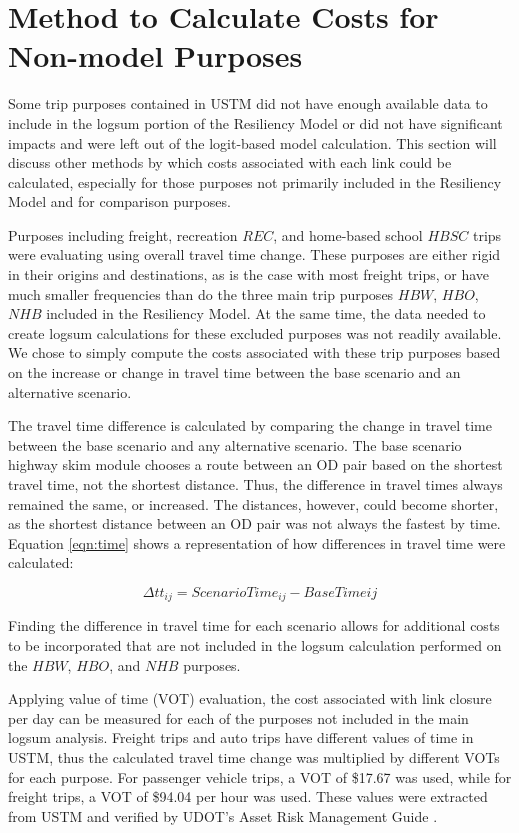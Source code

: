 \section{Method to Calculate Costs for Non-model Purposes}

Some trip purposes contained in USTM did not have enough available data to
include in the logsum portion of the Resiliency Model or did not have
significant impacts and were left out of the logit-based model
calculation. This section will discuss other methods by which costs
associated with each link could be calculated, especially for those
purposes not primarily included in the Resiliency Model and for comparison purposes.

Purposes including freight, recreation \(REC\), and home-based school
\(HBSC\) trips were evaluating using overall travel time change. These
purposes are either rigid in their origins and destinations, as is the
case with most freight trips, or have much smaller frequencies than do the
three main trip purposes \(HBW\), \(HBO\), \(NHB\) included in the Resiliency
Model. At the same time, the data needed to create logsum calculations for these
excluded purposes was not readily available. We chose to simply compute the costs associated with these trip
purposes based on the increase or change in travel time between the base
scenario and an alternative scenario.

The travel time difference is calculated by comparing the change in travel
time between the base scenario and any alternative scenario. The base
scenario highway skim module chooses a route between an OD pair based on
the shortest travel time, not the shortest distance. Thus, the difference
in travel times always remained the same, or increased. The distances, however,
could become shorter, as the shortest distance between an OD pair was not
always the fastest by time. Equation \ref{eqn:time} shows a representation of how
differences in travel time were calculated:

\begin{equation}
	\Delta tt_{ij} = ScenarioTime_{ij} - BaseTime{ij}
	\label{eqn:time}
\end{equation}

Finding the difference in travel time for each scenario allows for
additional costs to be incorporated that are not included in the logsum
calculation performed on the \(HBW\), \(HBO\), and \(NHB\) purposes.

Applying value of time (VOT) evaluation, the cost associated with link
closure per day can be measured for each of the purposes not included in
the main logsum analysis. Freight trips and auto trips have different
values of time in USTM, thus the calculated travel time change was
multiplied by different VOTs for each purpose. For passenger vehicle
trips, a VOT of \$17.67 was used, while for freight trips, a VOT of
\$94.04 per hour was used. These values were extracted from USTM and
verified by UDOT's Asset Risk Management Guide \citep{UtahDepartmentofTransportation2020}.

